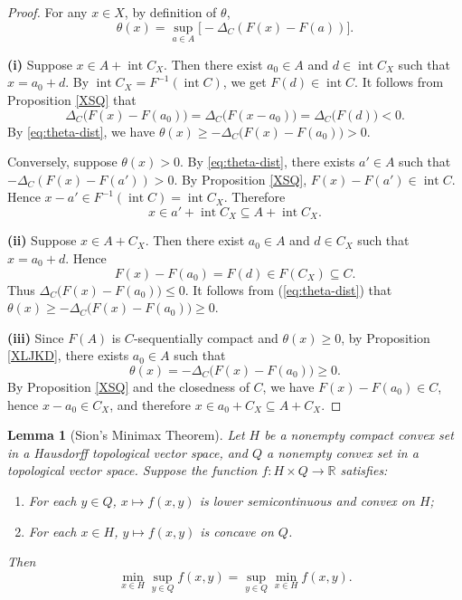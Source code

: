 \documentclass[10pt,a4paper]{amsart}
\newtheorem{lemma}{Lemma}[section]
\begin{document}
\begin{proof}
	For any $x\in X$, by definition of $\theta$,
	\begin{equation}\label{eq:theta-dist}
		\theta(x)=\sup_{a\in A}\bigl[-\Delta_C(F(x)-F(a))\bigr].
	\end{equation}
	
	\textbf{(i)} Suppose $x\in A+\operatorname{int}C_X$. Then there exist $a_0\in A$ and $d\in\operatorname{int}C_X$ such that $x=a_0+d$. By   $\operatorname{int}C_X=F^{-1}(\operatorname{int}C)$, we get $F(d)\in\operatorname{int}C$. It follows from   Proposition \ref{XSQ} that
	$${\Delta _C}\bigl( F(x) - F(a_0) \bigr) = {\Delta _C}\bigl( F(x - a_0) \bigr) = {\Delta _C}\bigl( F(d) \bigr) < 0.$$
	By \eqref{eq:theta-dist}, we have  $\theta(x) \ge -{\Delta _C}\bigl( F(x) - F(a_0) \bigr) > 0$.
	
	Conversely, suppose $\theta(x)>0$. By \eqref{eq:theta-dist}, there exists $a' \in A$ such that
	$-\Delta_C(F(x) - F(a')) > 0$.
	By Proposition \ref{XSQ},
	$F(x) - F(a') \in \operatorname{int} C$.
	Hence
	$x - a' \in F^{-1}(\operatorname{int} C) = \operatorname{int} C_X$.
	Therefore
	$$x \in a' + \operatorname{int} C_X \subseteq A + \operatorname{int} C_X.$$
	
	\textbf{(ii)} Suppose $x\in A + C_X$. Then there exist $a_0\in A$ and $d\in C_X$ such that $x=a_0+d$. Hence
	\[
	F(x)-F(a_0)=F(d)\in F(C_X)\subseteq C.
	\]
	Thus ${\Delta _C}\bigl( F(x) - F(a_0) \bigr) \le0$.     It follows from  (\ref{eq:theta-dist})  that
	$\theta(x) \ge -{\Delta _C}\bigl( F(x) - F(a_0) \bigr) \ge 0$.
	
	\textbf{(iii)} Since $F(A)$ is $C$-sequentially compact and $\theta(x)\ge 0$, by Proposition \ref{XLJKD}, there exists $a_0 \in A$ such that
	$$\theta(x) = -{\Delta _C}\bigl( F(x) - F(a_0) \bigr) \ge 0.$$
	By Proposition \ref{XSQ} and the closedness of $C$, we have $F(x)-F(a_0) \in C$, hence $x - a_0 \in C_X$, and therefore
	$x \in a_0 + C_X \subseteq A + C_X.$
\end{proof}

 

\begin{lemma}[Sion's Minimax Theorem]\label{SJDJX}
	Let $H$ be a nonempty compact convex set in a Hausdorff topological vector space, and $Q$ a nonempty convex set in a topological vector space. Suppose the function $f : H \times Q \to \mathbb{R}$ satisfies:
	\begin{enumerate}
		\item For each $y \in Q$, $x \mapsto f(x,y)$ is lower semicontinuous and convex on $H$;
		\item For each $x \in H$, $y \mapsto f(x,y)$ is concave on $Q$.
	\end{enumerate}
	Then
	\[
	\min_{x \in H} \sup_{y \in Q} f(x,y) = \sup_{y \in Q} \min_{x \in H} f(x,y).
	\]
\end{lemma}
\end{document}
